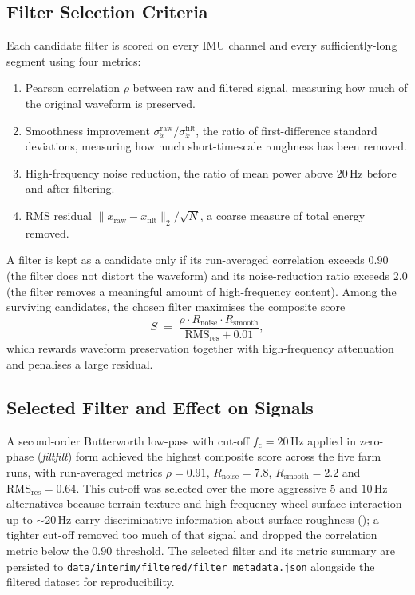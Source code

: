 \subsection{Filter Selection Criteria}

Each candidate filter is scored on every IMU channel and every sufficiently-long segment using four metrics:
\begin{enumerate}
    \item Pearson correlation $\rho$ between raw and filtered signal, measuring how much of the original waveform is preserved.
    \item Smoothness improvement $\sigma_{\dot{x}}^{\mathrm{raw}} / \sigma_{\dot{x}}^{\mathrm{filt}}$, the ratio of first-difference standard deviations, measuring how much short-timescale roughness has been removed.
    \item High-frequency noise reduction, the ratio of mean power above $20\,\text{Hz}$ before and after filtering.
    \item RMS residual $\|x_{\mathrm{raw}} - x_{\mathrm{filt}}\|_2 / \sqrt{N}$, a coarse measure of total energy removed.
\end{enumerate}
A filter is kept as a candidate only if its run-averaged correlation exceeds $0.90$ (the filter does not distort the waveform) and its noise-reduction ratio exceeds $2.0$ (the filter removes a meaningful amount of high-frequency content). Among the surviving candidates, the chosen filter maximises the composite score
\begin{equation}
    S \;=\; \frac{\rho \cdot R_{\mathrm{noise}} \cdot R_{\mathrm{smooth}}}{\mathrm{RMS}_{\mathrm{res}} + 0.01},
    \label{eq:filter_score}
\end{equation}
which rewards waveform preservation together with high-frequency attenuation and penalises a large residual.

\subsection{Selected Filter and Effect on Signals}

A second-order Butterworth low-pass with cut-off $f_{\mathrm{c}} = 20\,\text{Hz}$ applied in zero-phase (\emph{filtfilt}) form achieved the highest composite score across the five farm runs, with run-averaged metrics $\rho = 0.91$, $R_{\mathrm{noise}} = 7.8$, $R_{\mathrm{smooth}} = 2.2$ and $\mathrm{RMS}_{\mathrm{res}} = 0.64$. This cut-off was selected over the more aggressive $5$ and $10\,\text{Hz}$ alternatives because terrain texture and high-frequency wheel-surface interaction up to $\sim 20\,\text{Hz}$ carry discriminative information about surface roughness (); a tighter cut-off removed too much of that signal and dropped the correlation metric below the $0.90$ threshold. The selected filter and its metric summary are persisted to \texttt{data/interim/filtered/filter\_metadata.json} alongside the filtered dataset for reproducibility.

